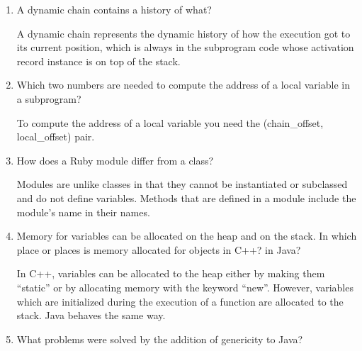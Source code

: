 \begin{enumerate}
\begin{answer}
\end{answer}

  \item A dynamic chain contains a history of what?

\begin{answer}

  A dynamic chain represents the dynamic history of how the execution got to its current position, which is always in the subprogram code whose activation record instance is on top of the stack.
  
\end{answer}

  \item Which two numbers are needed to compute
    the address of a local variable in a subprogram?

\begin{answer}

To compute the address of a local variable you need the (chain_offset, local_offset) pair.

\end{answer}

  \item How does a Ruby module differ from a class?
  
  \begin{answer}
  
  Modules are unlike classes in that they cannot be instantiated or subclassed and do not define variables. Methods that are defined in a module include the module’s name in their names.
  
\end{answer}

  \item Memory for variables can be allocated on the heap
    and on the stack. In which place or places is memory
    allocated for objects in C++? in Java?
    
\begin{answer}

    In C++, variables can be allocated to the heap either by making them “static” or by allocating memory with the keyword “new”. However, variables which are initialized during the execution of a function are allocated to the stack. Java behaves the same way.
    
\end{answer}

  \item What problems were solved by the addition
    of genericity to Java?
    

\end{enumerate}
